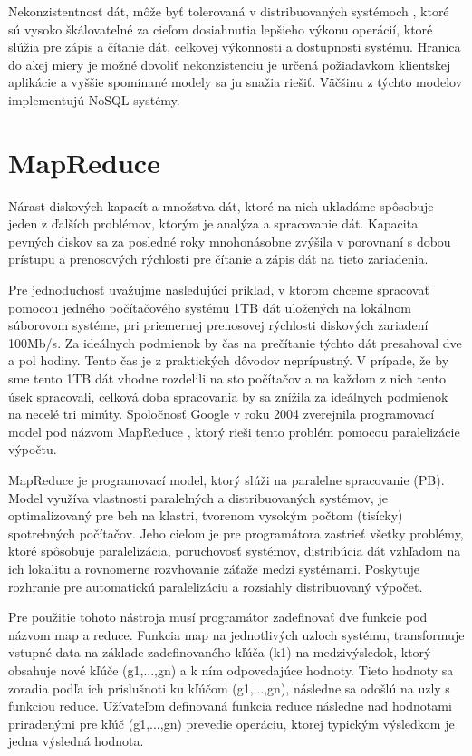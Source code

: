 \documentclass[11pt,twoside,a4paper]{book}
\begin{document}
Nekonzistentnosť dát, môže byť tolerovaná v distribuovaných systémoch , ktoré sú vysoko škálovateľné za cieľom dosiahnutia lepšieho výkonu operácií, ktoré slúžia pre zápis a čítanie dát, celkovej výkonnosti a dostupnosti systému. Hranica do akej miery je možné dovoliť nekonzistenciu je určená požiadavkom klientskej aplikácie a vyššie spomínané modely sa ju snažia riešiť. Väčšinu z týchto modelov implementujú NoSQL systémy.


\section{MapReduce}
Nárast diskových kapacít a množstva dát, ktoré na nich ukladáme spôsobuje jeden z ďalších problémov, ktorým je analýza a spracovanie dát. Kapacita pevných diskov sa za posledné roky mnohonásobne zvýšila v porovnaní s dobou prístupu a prenosových rýchlosti pre čítanie a zápis dát na tieto zariadenia.

Pre jednoduchosť uvažujme nasledujúci príklad, v ktorom chceme spracovať pomocou jedného počítačového systému 1TB dát uložených na lokálnom súborovom systéme, pri priemernej prenosovej rýchlosti diskových zariadení 100Mb/s. Za ideálnych podmienok by čas na prečítanie týchto dát presahoval dve a pol hodiny. Tento čas je z praktických dôvodov neprípustný. V prípade, že by sme tento 1TB dát vhodne rozdelili na sto počítačov a na každom z nich tento úsek spracovali, celková doba spracovania by sa znížila za ideálnych podmienok na necelé tri minúty. Spoločnosť Google v roku 2004 zverejnila programovací model pod názvom MapReduce \cite{mapreduce}, ktorý rieši tento problém pomocou paralelizácie výpočtu.

MapReduce je programovací model, ktorý slúži na paralelne spracovanie (PB). Model využíva vlastnosti paralelných a distribuovaných systémov, je optimalizovaný pre beh na klastri, tvorenom vysokým počtom (tisícky) spotrebných počítačov. Jeho cieľom je pre programátora zastrieť všetky problémy, ktoré spôsobuje paralelizácia, poruchovosť systémov, distribúcia dát vzhľadom na ich lokalitu a rovnomerne rozvhovanie záťaže medzi systémami. Poskytuje rozhranie pre automatickú paralelizáciu a rozsiahly distribuovaný výpočet.

Pre použitie tohoto nástroja musí programátor zadefinovať dve funkcie pod názvom map a reduce. Funkcia map na jednotlivých uzloch systému, transformuje vstupné data na základe zadefinovaného kľúča (k1) na medzivýsledok, ktorý obsahuje nové kľúče (g1,...,gn) a k ním odpovedajúce hodnoty. Tieto hodnoty sa zoradia podľa ich prislušnoti ku kľúčom (g1,...,gn), následne sa odošlú na uzly s funkciou reduce. Užívateľom definovaná funkcia reduce následne nad hodnotami priradenými pre kľúč (g1,...,gn) prevedie operáciu, ktorej typickým výsledkom je jedna výsledná hodnota.
\end{document}
